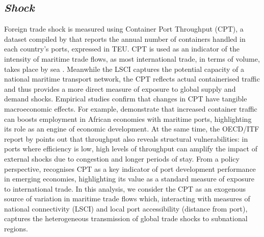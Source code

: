 \subsection{\textit{Shock}}
Foreign trade shock is measured using Container Port Throughput (CPT), a dataset compiled by \textcite{unctad2025} that reports the annual number of containers handled in each country's ports, expressed in TEU. CPT is used as an indicator of the intensity of maritime trade flows, as most international trade, in terms of volume, takes place by sea \parencite{ayesu2024estimating}. Meanwhile the LSCI captures the potential capacity of a national maritime transport network, the CPT reflects actual containerised traffic and thus provides a more direct measure of exposure to global supply and demand shocks. Empirical studies confirm that changes in CPT have tangible macroeconomic effects. For example, \textcite{ayesu2024estimating} demonstrate that increased container traffic can boosts employment in African economies with maritime ports, highlighting its role as an engine of economic development. At the same time, the OECD/ITF report by \textcite{ducruet2014time} points out that throughput also reveals structural vulnerabilities: in ports where efficiency is low, high levels of throughput can amplify the impact of external shocks due to congestion and longer periods of stay. From a policy perspective, \textcite{united2011review} recognises CPT as a key indicator of port development performance in emerging economies, highlighting its value as a standard measure of exposure to international trade. In this analysis, we consider the CPT as an exogenous source of variation in maritime trade flows which, interacting with measures of national connectivity (LSCI) and local port accessibility (distance from port), captures the heterogeneous transmission of global trade shocks to subnational regions.\\

